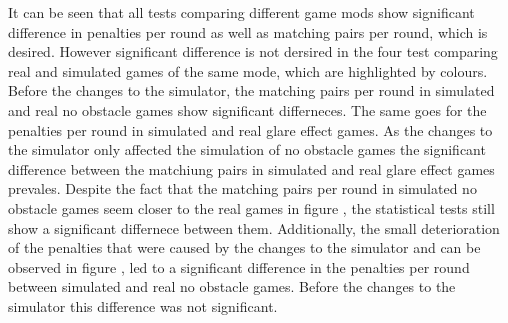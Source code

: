 It can be seen that all tests comparing different game mods show significant difference in penalties per round as well as matching pairs per round, which is desired. However significant difference is not dersired in the four test comparing real and simulated games of the same mode, which are highlighted by colours. Before the changes to the simulator, the matching pairs per round in simulated and real no obstacle games show significant differneces. The same goes for the penalties per round in simulated and real glare effect games. As the changes to the simulator only affected the simulation of no obstacle games the significant difference between the matchiung pairs in simulated and real glare effect games prevales. Despite the fact that the matching pairs per round in simulated no obstacle games seem closer to the real games in figure , the statistical tests still show a significant differnece between them. Additionally, the small deterioration of the penalties that were caused by the changes to the simulator and can be observed in figure , led to a significant difference in the penalties per round between simulated and real no obstacle games. Before the changes to the simulator this difference was not significant.  

